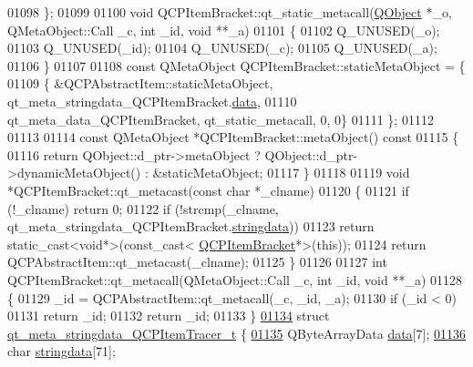 \begin{DoxyCode}
01098 \};
01099 
01100 \textcolor{keywordtype}{void} QCPItemBracket::qt\_static\_metacall(\hyperlink{a00059}{QObject} *\_o, QMetaObject::Call \_c, \textcolor{keywordtype}{int} \_id, \textcolor{keywordtype}{void} **\_a)
01101 \{
01102     Q\_UNUSED(\_o);
01103     Q\_UNUSED(\_id);
01104     Q\_UNUSED(\_c);
01105     Q\_UNUSED(\_a);
01106 \}
01107 
01108 \textcolor{keyword}{const} QMetaObject QCPItemBracket::staticMetaObject = \{
01109     \{ &QCPAbstractItem::staticMetaObject, qt\_meta\_stringdata\_QCPItemBracket.\hyperlink{a00067_a15ff7a0bed3ecf746215a57a076c296b}{data},
01110       qt\_meta\_data\_QCPItemBracket,  qt\_static\_metacall, 0, 0\}
01111 \};
01112 
01113 
01114 \textcolor{keyword}{const} QMetaObject *QCPItemBracket::metaObject()\textcolor{keyword}{ const}
01115 \textcolor{keyword}{}\{
01116     \textcolor{keywordflow}{return} QObject::d\_ptr->metaObject ? QObject::d\_ptr->dynamicMetaObject() : &staticMetaObject;
01117 \}
01118 
01119 \textcolor{keywordtype}{void} *QCPItemBracket::qt\_metacast(\textcolor{keyword}{const} \textcolor{keywordtype}{char} *\_clname)
01120 \{
01121     \textcolor{keywordflow}{if} (!\_clname) \textcolor{keywordflow}{return} 0;
01122     \textcolor{keywordflow}{if} (!strcmp(\_clname, qt\_meta\_stringdata\_QCPItemBracket.\hyperlink{a00067_a2e0cf4afc3bc921fbe6f35930bfbd9af}{stringdata}))
01123         \textcolor{keywordflow}{return} \textcolor{keyword}{static\_cast<}\textcolor{keywordtype}{void}*\textcolor{keyword}{>}(\textcolor{keyword}{const\_cast<} \hyperlink{a00033}{QCPItemBracket}*\textcolor{keyword}{>}(\textcolor{keyword}{this}));
01124     \textcolor{keywordflow}{return} QCPAbstractItem::qt\_metacast(\_clname);
01125 \}
01126 
01127 \textcolor{keywordtype}{int} QCPItemBracket::qt\_metacall(QMetaObject::Call \_c, \textcolor{keywordtype}{int} \_id, \textcolor{keywordtype}{void} **\_a)
01128 \{
01129     \_id = QCPAbstractItem::qt\_metacall(\_c, \_id, \_a);
01130     \textcolor{keywordflow}{if} (\_id < 0)
01131         \textcolor{keywordflow}{return} \_id;
01132     \textcolor{keywordflow}{return} \_id;
01133 \}
\hypertarget{a00067_source_l01134}{}\hyperlink{a00067}{01134} \textcolor{keyword}{struct }\hyperlink{a00067_d5/df1/a00206}{qt\_meta\_stringdata\_QCPItemTracer\_t} \{
\hypertarget{a00067_source_l01135}{}\hyperlink{a00067_a87c91fdce2044ef334c2cfd91e38ac00}{01135}     QByteArrayData \hyperlink{a00067_a87c91fdce2044ef334c2cfd91e38ac00}{data}[7];
\hypertarget{a00067_source_l01136}{}\hyperlink{a00067_a28c4c1cde887cbe6b6af18ce9d6ed867}{01136}     \textcolor{keywordtype}{char} \hyperlink{a00067_a28c4c1cde887cbe6b6af18ce9d6ed867}{stringdata}[71];

\end{DoxyCode}

